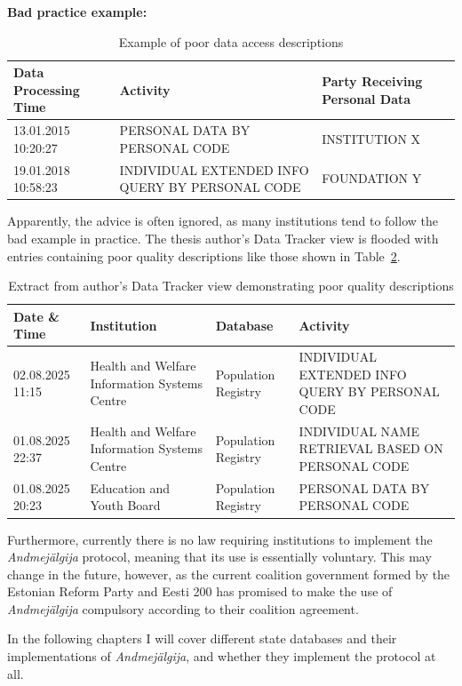\textbf{Bad practice example:}

\begin{table}[H]
\centering
\begin{tabular}{|p{3cm}|p{6cm}|p{4cm}|}
\hline
\textbf{Data Processing Time} & \textbf{Activity} & \textbf{Party Receiving Personal Data} \\
\hline
13.01.2015 10:20:27 & PERSONAL DATA BY PERSONAL CODE & INSTITUTION X \\
\hline
19.01.2018 10:58:23 & INDIVIDUAL EXTENDED INFO QUERY BY PERSONAL CODE & FOUNDATION Y \\
\hline
\end{tabular}
\caption{Example of poor data access descriptions\cite{ria-andmejalgija-recommendations}}
\label{tab:example-bad}
\end{table}

Apparently, the advice is often ignored, as many institutions tend to follow the bad example in practice. The thesis author's Data Tracker view is flooded with entries containing poor quality descriptions like those shown in Table~\ref{tab:author-data-tracker}.

\begin{table}[H]
\centering
\begin{tabular}{|p{2.5cm}|p{5cm}|p{3cm}|p{3.5cm}|}
\hline
\textbf{Date \& Time} & \textbf{Institution} & \textbf{Database} & \textbf{Activity} \\
\hline
02.08.2025 11:15 & Health and Welfare Information Systems Centre & Population Registry & INDIVIDUAL EXTENDED INFO QUERY BY PERSONAL CODE \\
\hline
01.08.2025 22:37 & Health and Welfare Information Systems Centre & Population Registry & INDIVIDUAL NAME RETRIEVAL BASED ON PERSONAL CODE \\
\hline
01.08.2025 20:23 & Education and Youth Board & Population Registry & PERSONAL DATA BY PERSONAL CODE \\
\hline
\end{tabular}
\caption{Extract from author's Data Tracker view demonstrating poor quality descriptions}
\label{tab:author-data-tracker}
\end{table}

Furthermore, currently there is no law requiring institutions to implement the \textit{Andmejälgija} protocol, meaning that its use is essentially voluntary. This may change in the future, however, as the current coalition government formed by the Estonian Reform Party and Eesti 200 has promised to make the use of \textit{Andmejälgija} compulsory according to their coalition agreement\cite{coalition-agreement-2025-2027}.

In the following chapters I will cover different state databases and their implementations of \textit{Andmejälgija}, and whether they implement the protocol at all.